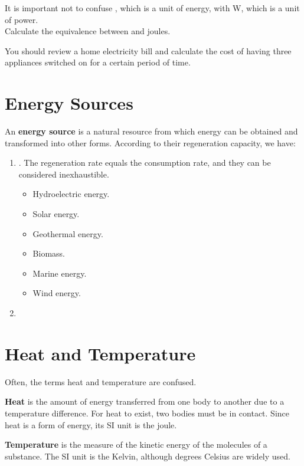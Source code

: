 \begin{remark}
    It is important not to confuse \unit{\kwh}, which is a unit of energy, with \unit{\watt}, which is a unit of power.\\
    Calculate the equivalence between \unit{\kwh} and joules.
\end{remark}

\begin{exercise}
    You should review a home electricity bill and calculate the cost of having three appliances switched on for a certain period of time.
\end{exercise}


\section{Energy Sources}

An \textbf{energy source} is a natural resource from which energy can be obtained and transformed into other forms.
According to their regeneration capacity, we have:

\begin{enumerate}[label=\numberballmDarkTeal]
\item {}.
The regeneration rate equals the consumption rate, and they can be considered inexhaustible.
\begin{itemize}
    \item Hydroelectric energy.
    \item Solar energy.
    \item Geothermal energy.
    \item Biomass.
    \item Marine energy.
    \item Wind energy.
\end{itemize}
\item {}
\end{enumerate}


\section{Heat and Temperature}

Often, the terms heat and temperature are confused.

\textbf{Heat} is the amount of energy transferred from one body to another due to a temperature difference.
For heat to exist, two bodies must be in contact.
Since heat is a form of energy, its SI unit is the joule.

\textbf{Temperature} is the measure of the kinetic energy of the molecules of a substance.
The SI unit is the Kelvin, although degrees Celsius are widely used.

